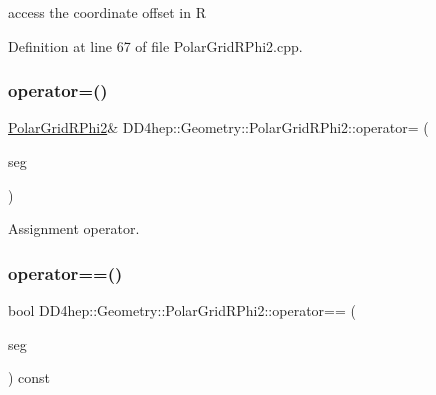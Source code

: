 access the coordinate offset in R 



Definition at line 67 of file Polar\+Grid\+R\+Phi2.\+cpp.

\hypertarget{class_d_d4hep_1_1_geometry_1_1_polar_grid_r_phi2_aba3d404c57a059c35d5df97510163125}{}\label{class_d_d4hep_1_1_geometry_1_1_polar_grid_r_phi2_aba3d404c57a059c35d5df97510163125} 
\subsubsection{\texorpdfstring{operator=()}{operator=()}}
{\footnotesize\ttfamily \hyperlink{class_d_d4hep_1_1_geometry_1_1_polar_grid_r_phi2}{Polar\+Grid\+R\+Phi2}\& D\+D4hep\+::\+Geometry\+::\+Polar\+Grid\+R\+Phi2\+::operator= (\begin{DoxyParamCaption}\item[{const \hyperlink{class_d_d4hep_1_1_geometry_1_1_polar_grid_r_phi2}{Polar\+Grid\+R\+Phi2} \&}]{seg }\end{DoxyParamCaption})\hspace{0.3cm}{\ttfamily [default]}}



Assignment operator. 

\hypertarget{class_d_d4hep_1_1_geometry_1_1_polar_grid_r_phi2_a12ade22a092c98a357fa54c747172e49}{}\label{class_d_d4hep_1_1_geometry_1_1_polar_grid_r_phi2_a12ade22a092c98a357fa54c747172e49} 
\subsubsection{\texorpdfstring{operator==()}{operator==()}}
{\footnotesize\ttfamily bool D\+D4hep\+::\+Geometry\+::\+Polar\+Grid\+R\+Phi2\+::operator== (\begin{DoxyParamCaption}\item[{const \hyperlink{class_d_d4hep_1_1_geometry_1_1_polar_grid_r_phi2}{Polar\+Grid\+R\+Phi2} \&}]{seg }\end{DoxyParamCaption}) const\hspace{0.3cm}{\ttfamily [inline]}}



